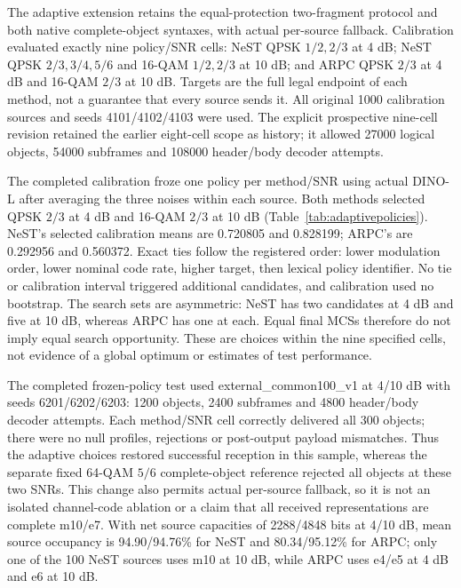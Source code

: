 The adaptive extension retains the equal-protection two-fragment protocol and both native complete-object syntaxes, with actual per-source fallback. Calibration evaluated exactly nine policy/SNR cells: NeST QPSK $1/2,2/3$ at 4 dB; NeST QPSK $2/3,3/4,5/6$ and 16-QAM $1/2,2/3$ at 10 dB; and ARPC QPSK $2/3$ at 4 dB and 16-QAM $2/3$ at 10 dB. Targets are the full legal endpoint of each method, not a guarantee that every source sends it. All original 1000 calibration sources and seeds 4101/4102/4103 were used. The explicit prospective nine-cell revision retained the earlier eight-cell scope as history; it allowed 27000 logical objects, 54000 subframes and 108000 header/body decoder attempts.


The completed calibration froze one policy per method/SNR using actual DINO-L after averaging the three noises within each source. Both methods selected QPSK $2/3$ at 4 dB and 16-QAM $2/3$ at 10 dB (Table~\ref{tab:adaptivepolicies}). NeST's selected calibration means are 0.720805 and 0.828199; ARPC's are 0.292956 and 0.560372. Exact ties follow the registered order: lower modulation order, lower nominal code rate, higher target, then lexical policy identifier. No tie or calibration interval triggered additional candidates, and calibration used no bootstrap. The search sets are asymmetric: NeST has two candidates at 4 dB and five at 10 dB, whereas ARPC has one at each. Equal final MCSs therefore do not imply equal search opportunity. These are choices within the nine specified cells, not evidence of a global optimum or estimates of test performance.

The completed frozen-policy test used external\_common100\_v1 at 4/10 dB with seeds 6201/6202/6203: 1200 objects, 2400 subframes and 4800 header/body decoder attempts. Each method/SNR cell correctly delivered all 300 objects; there were no null profiles, rejections or post-output payload mismatches. Thus the adaptive choices restored successful reception in this sample, whereas the separate fixed 64-QAM $5/6$ complete-object reference rejected all objects at these two SNRs. This change also permits actual per-source fallback, so it is not an isolated channel-code ablation or a claim that all received representations are complete m10/e7. With net source capacities of 2288/4848 bits at 4/10 dB, mean source occupancy is 94.90/94.76\% for NeST and 80.34/95.12\% for ARPC; only one of the 100 NeST sources uses m10 at 10 dB, while ARPC uses e4/e5 at 4 dB and e6 at 10 dB.

